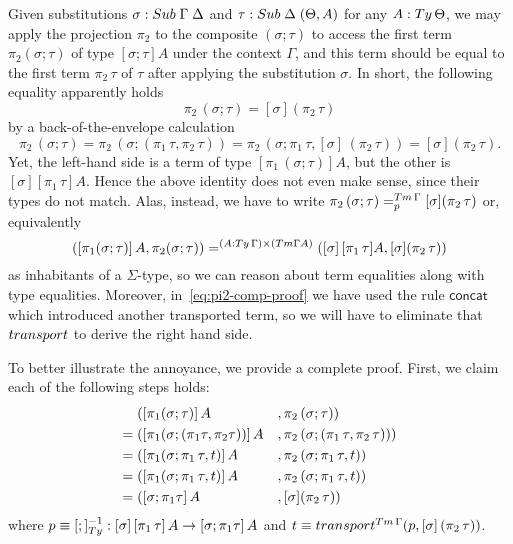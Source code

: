 \documentclass[a4paper,UKenglish,numberwithinsect,cleveref,thm-restate]{lipics-v2021}
\begin{document}
\begin{example}
  Given substitutions $\sigma : \Sub\;\Gamma\; \Delta$ and $\tau : \Sub\;\Delta\;(\Theta, A)$ for any $A : \Ty\,\Theta$, we may apply the projection $\pi_2$ to the composite $(\sigma; \tau)$ to access the first term $\pi_2(\sigma; \tau)$ of type $[\sigma;\tau] A$ under the context $\Gamma$, and this term should be equal to the first term $\pi_2\,\tau$ of $\tau$ after applying the substitution $\sigma$. 
  In short, the following equality apparently holds
  \[
    \pi_2\,(\sigma ; \tau) = [\sigma] (\pi_2\,\tau)
  \]
  by a back-of-the-envelope calculation
  \begin{equation} \label{eq:pi2-comp-proof}
    \pi_2\,(\sigma ; \tau) 
    = \pi_2\,(\sigma; (\pi_1\,\tau, \pi_2\,\tau))
    = \pi_2\,(\sigma;\pi_1\,\tau, [\sigma]\,(\pi_2\,\tau))
    = [\sigma] (\pi_2\,\tau).
  \end{equation}
  Yet, the left-hand side is a term of type $[\pi_1\,(\sigma;\tau)] A$, but the other is $[\sigma] [\pi_1\,\tau] A$.
  Hence the above identity does not even make sense, since their types do not match.
  Alas, instead, we have to write $\pi_2\,(\sigma ; \tau) =^{\Tm\,\Gamma}_{p} [\sigma] (\pi_2\,\tau)$ or, equivalently
  \[
    ([\pi_1(\sigma; \tau)]\,A, \pi_2(\sigma; \tau)) =^{(A : \Ty\,\Gamma) \times (\Tm \Gamma A)} ([\sigma]\,[\pi_1\,\tau]A, [\sigma] (\pi_2\,\tau))
  \]
  as inhabitants of a $\Sigma$-type, so we can reason about term equalities along with type equalities.
  Moreover, in~\eqref{eq:pi2-comp-proof} we have used the rule $\mathsf{concat}$ which introduced another transported term, so we will have to eliminate that $\transp$ to derive the right hand side.

  To better illustrate the annoyance, we provide a complete proof.
  First, we claim each of the following steps holds:
  \begin{alignat}{3}
         & ([\pi_1(\sigma; \tau)]\,A                    &&, \pi_2\,(\sigma ; \tau)) \label{eq:pi2-proof-1} \\
    = {} & ([\pi_1(\sigma; (\pi_1\tau , \pi_2\tau))]\,A &&, \pi_2\,(\sigma; (\pi_1\,\tau, \pi_2\,\tau))) \\
    = {} & ([\pi_1(\sigma;\pi_1\,\tau, t)]\,A &&, \pi_2\,(\sigma;\pi_1\,\tau, t)) \nonumber \\
    = {} & ([\pi_1(\sigma;\pi_1\,\tau, t)]\,A &&, \pi_2\,(\sigma;\pi_1\,\tau, t)) \nonumber \\
    = {} & ([\sigma;\pi_1\tau]\,{A} &&, [\sigma] (\pi_2\,\tau)) \nonumber
  \end{alignat}
  where $p \judgeq [;]_{\Ty}^{-1} : \sub{\sigma}{\sub{\pi_1\,\tau}{A}} \to \sub{\sigma; \pi_1 \tau}{A}$ and $t \judgeq\transfib{\Tm\,\Gamma}{p}{[\sigma]\,(\pi_2\,\tau)}$.
\end{example}
\end{document}

